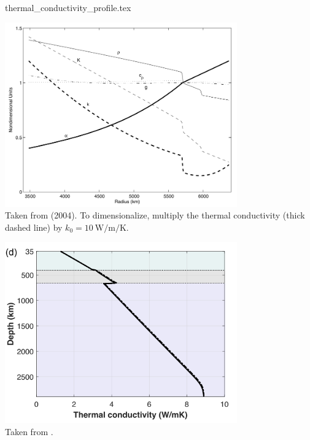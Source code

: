 \begin{flushright} {\tiny {\color{gray} thermal\_conductivity\_profile.tex}} \end{flushright}


\begin{center}
\includegraphics[width=10cm]{images/thermal_expansion/buja04}\\
{\captionfont 
Taken from \textcite{buja04} (2004).
To dimensionalize, multiply 
the thermal conductivity (thick dashed line) by $k_0=10~\si{\watt\per\meter\per\kelvin}$.
}
\end{center}

\begin{center}
\includegraphics[width=10cm]{images/thermal_conductivity/nemi23}\\
{\captionfont Taken from \textcite{nemi23}.}
\end{center}

